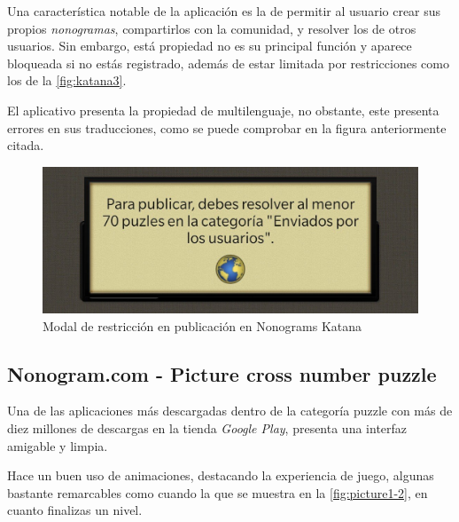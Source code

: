 Una característica notable de la aplicación es la de permitir al usuario crear sus propios \textit{nonogramas}, compartirlos con la comunidad, y resolver los de
 otros usuarios. Sin embargo, está propiedad no es su principal función y aparece bloqueada si no estás registrado, además de estar limitada por restricciones como los de la 
 \autoref{fig:katana3}.

 El aplicativo presenta la propiedad de multilenguaje, no obstante, este presenta errores en sus traducciones, como se puede comprobar en la figura anteriormente
 citada.

 \begin{figure}[H]
   \centering
   \includegraphics[scale=.175]{images/nonokatana4.jpg}
   \caption{Modal de restricción en publicación en Nonograms Katana}
   \label{fig:katana3}
 \end{figure}
 

\subsection{Nonogram.com - Picture cross number puzzle}

Una de las aplicaciones más descargadas dentro de la categoría puzzle con más de diez millones de descargas en la tienda \textit{Google Play}, 
presenta una interfaz amigable y limpia.

Hace un buen uso de animaciones, destacando la experiencia de juego, algunas bastante remarcables como cuando la que se muestra en la 
\autoref{fig:picture1-2}, en cuanto finalizas un nivel.

